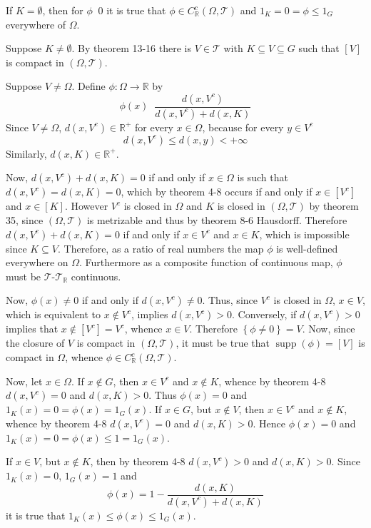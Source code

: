 \documentclass[a4paper]{article}
\newcommand{\obj}[1]{\left\{ #1 \right \}}
\newcommand{\clo}[1]{\left [ #1 \right ]}
\newcommand{\brac}[1]{\left ( #1 \right )}
\newcommand{\Real}{\mathbb{R}}
\newcommand{\Tcal}{\mathcal{T}}
\newcommand{\Supp}[1]{\operatorname{supp}\nolimits\brac{#1}}
\newcommand{\defn}{\mathop{\overset{\Delta}{=}}\nolimits}
\begin{document}
If $K=\emptyset$, then for $\phi\defn 0$ it is true that $\phi\in C^c_\Real\brac{\Omega,\Tcal}$ and $1_K = 0 = \phi\leq 1_G$ everywhere of $\Omega$.

Suppose $K\neq \emptyset$. By theorem 13-16 there is $V\in \Tcal$ with $K\subseteq V\subseteq G$ such that $\clo{V}$ is compact in $\brac{\Omega,\Tcal}$.

Suppose $V\neq \Omega$. Define $\phi:\Omega\to\Real$ by \[\phi\brac{x}\defn \frac{d\brac{x,V^c}}{d\brac{x,V^c}+d\brac{x,K}}\] Since $V\neq \Omega$, $d\brac{x,V^c}\in \Real^+$ for every $x\in \Omega$, because for every $y\in V^c$ \[d\brac{x,V^c}\leq d\brac{x,y}<+\infty\] Similarly, $d\brac{x,K}\in \Real^+$.

Now, $d\brac{x,V^c}+d\brac{x,K}=0$ if and only if $x\in \Omega$ is such that $d\brac{x,V^c}=d\brac{x,K}=0$, which by theorem 4-8 occurs if and only if $x\in \clo{V^c}$ and $x\in \clo{K}$. However $V^c$ is closed in $\Omega$ and $K$ is closed in $\brac{\Omega, \Tcal}$ by theorem 35, since $\brac{\Omega, \Tcal}$ is metrizable and thus by theorem 8-6 Hausdorff. Therefore $d\brac{x,V^c}+d\brac{x,K}=0$ if and only if $x\in V^c$ and $x\in K$, which is impossible since $K\subseteq V$. Therefore, as a ratio of real numbers the map $\phi$ is well-defined everywhere on $\Omega$. Furthermore as a composite function of continuous map, $\phi$ must be $\Tcal$-$\Tcal_\Real$ continuous.

Now, $\phi\brac{x}\neq 0$ if and only if $d\brac{x,V^c}\neq 0$. Thus, since $V^c$ is closed in $\Omega$, $x\in V$, which is equivalent to $x\notin V^c$, implies $d\brac{x,V^c}>0$. Conversely, if $d\brac{x,V^c}>0$ implies that $x\notin \clo{V^c}=V^c$, whence $x\in V$. Therefore $\obj{\phi\neq 0} = V$. Now, since the closure of $V$ is compact in $\brac{\Omega,\Tcal}$, it must be true that $\Supp{\phi} = \clo{V}$ is compact in $\Omega$, whence $\phi\in C^c_\Real\brac{\Omega,\Tcal}$.

Now, let $x\in \Omega$. If $x\notin G$, then $x\in V^c$ and $x\notin K$, whence by theorem 4-8 $d\brac{x,V^c}=0$ and $d\brac{x,K}>0$. Thus $\phi\brac{x}=0$ and $1_K\brac{x}=0 = \phi\brac{x} = 1_G\brac{x}$. If $x\in G$, but $x\notin V$, then $x\in V^c$ and $x\notin K$, whence by theorem 4-8 $d\brac{x,V^c}=0$ and $d\brac{x,K}>0$. Hence $\phi\brac{x}=0$ and $1_K\brac{x}=0=\phi\brac{x} \leq 1 = 1_G\brac{x}$.

If $x\in V$, but $x\notin K$, then by theorem 4-8 $d\brac{x,V^c}>0$ and $d\brac{x,K}>0$. Since $1_K\brac{x}=0$, $1_G\brac{x}=1$ and \[\phi\brac{x}=1-\frac{d\brac{x,K}}{d\brac{x,V^c}+d\brac{x,K}}\] it is true that $1_K\brac{x} \leq \phi\brac{x} \leq 1_G\brac{x}$.
\end{document}
